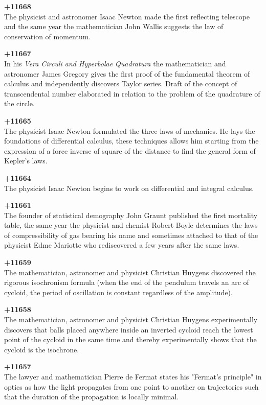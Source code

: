 \textbf{+11668}\\
The physicist and astronomer Isaac Newton made the first reflecting telescope and the same year the mathematician John Wallis suggests the law of conservation of momentum.

\textbf{+11667}\\
In his \textit{Vera Circuli and Hyperbolae Quadratura} the mathematician and astronomer James Gregory gives the first proof of the fundamental theorem of calculus and independently discovers Taylor series. Draft of the concept of transcendental number elaborated in relation to the problem of the quadrature of the circle.

\textbf{+11665}\\
The physicist Isaac Newton formulated the three laws of mechanics. He lays the foundations of differential calculus, these techniques allows him starting from the expression of a force inverse of square of the distance to find the general form of Kepler's laws.

\textbf{+11664}\\
The physicist Isaac Newton begins to work on differential and integral calculus.

\textbf{+11661}\\
The founder of statistical demography John Graunt published the first mortality table, the same year the physicist and chemist Robert Boyle determines the laws of compressibility of gas bearing his name and sometimes attached to that of the physicist Edme Mariotte who rediscovered a few years after the same laws.

\textbf{+11659}\\
The mathematician, astronomer and physicist Christian Huygens discovered the rigorous isochronism formula (when the end of the pendulum travels an arc of cycloid, the period of oscillation is constant regardless of the amplitude).

\textbf{+11658}\\
The mathematician, astronomer and physicist Christian Huygens experimentally discovers that balls placed anywhere inside an inverted cycloid reach the lowest point of the cycloid in the same time and thereby experimentally shows that the cycloid is the isochrone.

\textbf{+11657}\\
The lawyer and mathematician Pierre de Fermat states his "Fermat's principle" in optics as how the light propagates from one point to another on trajectories such that the duration of the propagation is locally minimal.

